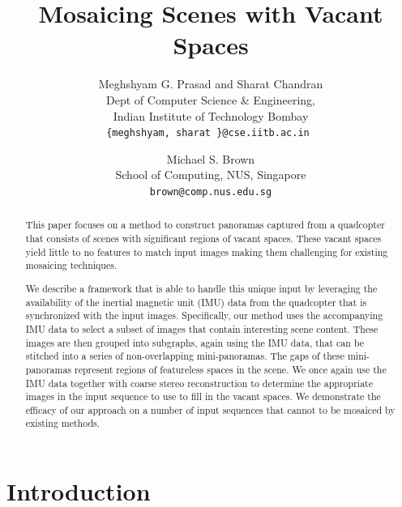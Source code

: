 \documentclass[10pt,twocolumn,letterpaper]{article}
\begin{document}
\title{Mosaicing Scenes with Vacant Spaces}

\author{Meghshyam G. Prasad and Sharat Chandran\\
Dept of Computer Science \& Engineering, \\
Indian Institute of Technology Bombay\\
{\tt\small \{meghshyam, sharat \}@cse.iitb.ac.in }
\and
Michael S. Brown\\
School of Computing, NUS, Singapore\\
{\tt\small brown@comp.nus.edu.sg}
}

\maketitle


\begin{abstract}
  This paper focuses on a method to construct panoramas captured from
  a quadcopter that consists of scenes with significant regions of
  vacant spaces.  These vacant spaces yield little to no features to
  match input images making them challenging for existing
  mosaicing techniques.  

  We describe a framework that is able to handle this unique input by
  leveraging the availability of the inertial magnetic unit (IMU) data
  from the quadcopter that is synchronized with the input images.
  Specifically, our method uses the accompanying IMU data to select a
  subset of images that contain interesting scene content.  These
  images are then grouped into subgraphs, again using the IMU data,
  that can be stitched into a series of non-overlapping
  mini-panoramas.  The gaps of these mini-panoramas represent regions
  of featureless spaces in the scene.  We once again use the IMU data
  together with coarse stereo reconstruction to determine the
  appropriate images in the input sequence to use to fill in the vacant
  spaces.  We demonstrate the efficacy of our approach on a number of
  input sequences that cannot to be mosaiced by existing methods.
\end{abstract}

\section{Introduction}
\end{document}
